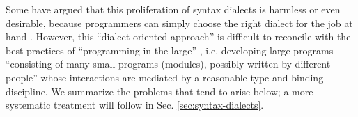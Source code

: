 
Some have argued that this proliferation of syntax dialects is harmless or even desirable, because programmers can simply choose the right dialect for the job at hand \cite{journals/stp/Ward94}. However, this ``dialect-oriented approach'' is difficult to reconcile with the best practices of ``programming in the large''  \cite{DeRemer76}, i.e. developing large programs ``consisting of many small programs (modules), possibly written by different people'' whose interactions are mediated by a reasonable type and binding discipline. We summarize the problems that tend to arise below; a more systematic treatment will follow in  Sec. \ref{sec:syntax-dialects}.

